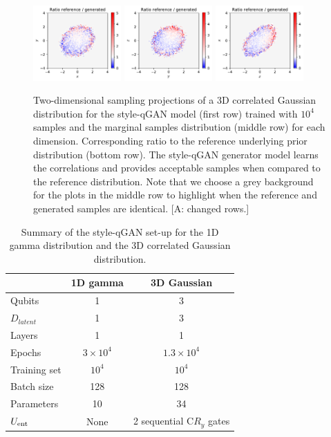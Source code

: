 \documentclass[twocolumn,preprintnumbers,superscriptaddress]{revtex4-2}
\newcommand{\commentAF}[1]{{\color{cyan} {[A: #1]}}}
\begin{document}
\begin{figure}
   \includegraphics[width=0.3\textwidth]{plots/3Dgaussian_posdef/1-2_RATIO_100k.pdf}%
  \includegraphics[width=0.3\textwidth]{plots/3Dgaussian_posdef/2-3_RATIO_100k.pdf}%
  \includegraphics[width=0.3\textwidth]{plots/3Dgaussian_posdef/3-1_RATIO_100k.pdf}


  \caption{\label{fig:3dgauss}Two-dimensional sampling projections of a 3D
  correlated Gaussian distribution for the style-qGAN model (first row) trained
  with $10^4$ samples and the marginal samples distribution (middle row)
  for each dimension. Corresponding ratio to the reference underlying
  prior distribution (bottom row).  The style-qGAN generator model learns the correlations and
  provides acceptable samples when compared to the reference distribution. Note that we choose a grey background for the plots in the middle row to highlight when the reference and generated samples are identical.\commentAF{changed rows.}}
\end{figure}

\begin{table}
  \begin{tabular}{l|c|c}
     & {\bf 1D gamma} & {\bf 3D Gaussian} \tabularnewline
    \hline
    Qubits & 1 & 3 \tabularnewline
    $D_{latent}$ & 1 & 3 \tabularnewline
    Layers & 1 & 1 \tabularnewline
    Epochs & $3\times10^4$ & $1.3\times10^4$ \tabularnewline
    Training set & $10^4$ & $10^4$ \tabularnewline
    Batch size & 128 & 128 \tabularnewline
    Parameters & 10 & 34 \tabularnewline
    $U_{\rm ent}$ & None & 2 sequential C$R_y$ gates \tabularnewline
    \hline
  \end{tabular}

  \caption{\label{table:summary} Summary of the style-qGAN set-up for the 1D
  gamma distribution and the 3D correlated Gaussian distribution.}
\end{table}
\end{document}
